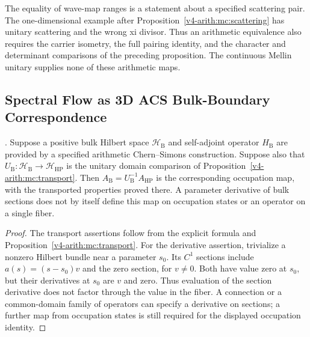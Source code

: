 \begin{remark}
\label{v4-arith:w9-r4:rem:scattering-transfers}
The equality of wave-map ranges is a statement about a specified
scattering pair. The one-dimensional example after
Proposition~\ref{v4-arith:mc:scattering} has unitary scattering and
the wrong xi divisor. Thus an arithmetic equivalence also requires
the carrier isometry, the full pairing identity, and the character
and determinant comparisons of the preceding proposition.
The continuous Mellin unitary supplies none of these arithmetic maps.
\end{remark}

\subsection{Spectral Flow as 3D ACS Bulk-Boundary Correspondence}
\label{v4-arith:w9-r4:placement:acs}

\begin{proposition}
\label{v4-arith:w9-r4:prop:spectral-flow-eq-acs}
\ClaimStatusProvedHereConditional. Suppose a positive bulk Hilbert space
$\mathcal H_{\mathrm B}$ and self-adjoint operator $H_{\mathrm B}$
are provided by a specified arithmetic Chern--Simons construction.
Suppose also that $U_{\mathrm B}:\mathcal H_{\mathrm B}\to
\mathcal H_{\mathrm{HP}}$ is the unitary domain comparison of
Proposition~\ref{v4-arith:mc:transport}.
Then $A_{\mathrm B}=U_{\mathrm B}^{-1}A_{\mathrm{HP}}$ is the
corresponding occupation map, with the transported properties proved
there. A parameter derivative of bulk sections does not by itself
define this map on occupation states or an operator on a single fiber.
\end{proposition}
\begin{proof}
The transport assertions follow from the explicit formula and
Proposition~\ref{v4-arith:mc:transport}.
For the derivative assertion, trivialize a nonzero Hilbert bundle
near a parameter $s_0$. Its $C^1$ sections include
$a(s)=(s-s_0)v$ and the zero section, for $v\ne0$.
Both have value zero at $s_0$, but their derivatives at $s_0$
are $v$ and zero. Thus evaluation of the section derivative does
not factor through the value in the fiber.
A connection or a common-domain family of operators can specify
a derivative on sections; a further map from occupation states
is still required for the displayed occupation identity.
\end{proof}

